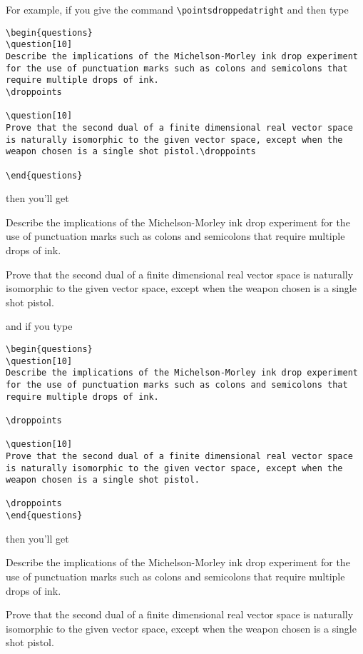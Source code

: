 \documentclass[12pt]{exam}
\begin{document}
For example, if you give the command \verb"\pointsdroppedatright" and
then type
\begin{verbatim}
\begin{questions}
\question[10]
Describe the implications of the Michelson-Morley ink drop experiment
for the use of punctuation marks such as colons and semicolons that
require multiple drops of ink.
\droppoints

\question[10]
Prove that the second dual of a finite dimensional real vector space
is naturally isomorphic to the given vector space, except when the
weapon chosen is a single shot pistol.\droppoints

\end{questions}
\end{verbatim}
then you'll get
\pointsdroppedatright
\begin{questions}
\question[10]
Describe the implications of the Michelson-Morley ink drop experiment
for the use of punctuation marks such as colons and semicolons that
require multiple drops of ink.
\droppoints

\question[10]
Prove that the second dual of a finite dimensional real vector space
is naturally isomorphic to the given vector space, except when the
weapon chosen is a single shot pistol.\droppoints

\end{questions}
and if you type
\begin{verbatim}
\begin{questions}
\question[10]
Describe the implications of the Michelson-Morley ink drop experiment
for the use of punctuation marks such as colons and semicolons that
require multiple drops of ink.

\droppoints

\question[10]
Prove that the second dual of a finite dimensional real vector space
is naturally isomorphic to the given vector space, except when the
weapon chosen is a single shot pistol.

\droppoints
\end{questions}
\end{verbatim}
then you'll get
\begin{questions}
\question[10]
Describe the implications of the Michelson-Morley ink drop experiment
for the use of punctuation marks such as colons and semicolons that
require multiple drops of ink.

\droppoints

\question[10]
Prove that the second dual of a finite dimensional real vector space
is naturally isomorphic to the given vector space, except when the
weapon chosen is a single shot pistol.

\droppoints
\end{questions}
\nopointsinmargin
\end{document}
